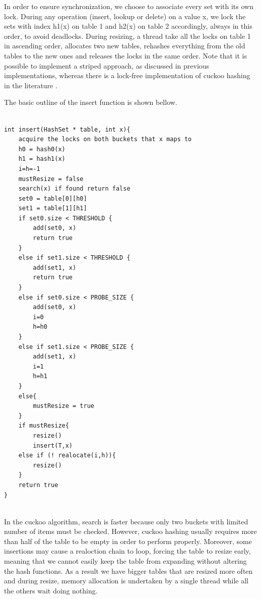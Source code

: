 In order to ensure synchronization, we choose to associate every set with its own lock. During any operation (insert, lookup or delete) on a value x, we lock the sets with index h1(x) on table 1 and h2(x) on table 2 accordingly, always in this order, to avoid deadlocks. During resizing, a thread take all the locks on table 1 in ascending order, allocates two new tables, rehashes everything from the old tables to the new ones and releases the locks in the same order. Note that it is possible to implement a striped approach, as discussed in previous implementations, whereas there is a lock-free implementation of cuckoo hashing in the literature \cite{lock_free_cuckoo}.

The basic outline of the insert function is shown bellow.

\begin{lstlisting}

int insert(HashSet * table, int x){
	acquire the locks on both buckets that x maps to
	h0 = hash0(x)
	h1 = hash1(x)
	i=h=-1
	mustResize = false
	search(x) if found return false
	set0 = table[0][h0]
	set1 = table[1][h1]
	if set0.size < THRESHOLD {
		add(set0, x)
		return true
	}
	else if set1.size < THRESHOLD {
		add(set1, x)
		return true
	}
	else if set0.size < PROBE_SIZE {
		add(set0, x)
		i=0 
		h=h0
	}
	else if set1.size < PROBE_SIZE {
		add(set1, x)
		i=1
		h=h1
	}
	else{
		mustResize = true
	}
	if mustResize{
		resize()	
		insert(T,x)
	else if (! realocate(i,h)){
		resize()
	}
	return true
}
		

\end{lstlisting}


In the cuckoo algorithm, search is faster because only two buckets with limited number of items must be checked. However, cuckoo hashing usually requires more than half of the table to be empty in order to perform properly. Moreover, some insertions may cause a realoction chain to loop, forcing the table to resize early, meaning that we cannot easily keep the table from expanding without altering the hash functions. As a result we have bigger tables that are resized more often and during resize, memory allocation is undertaken by a single thread while all the others wait doing nothing.

